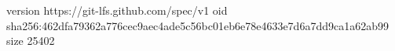 version https://git-lfs.github.com/spec/v1
oid sha256:462dfa79362a776cec9aec4ade5c56bc01eb6e78e4633e7d6a7dd9ca1a62ab99
size 25402
